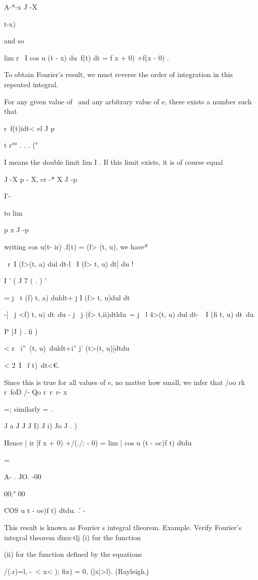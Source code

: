 A-*-x J -X

 t-x)

and so

lim r \ I cos u (t - x) du\ f(t) dt = \pi f x + 0) +f(x - 0) .

To obtain Fourier's result, we must reverse the order of integration
in this repeated integral.

For any given value of \ and any arbitrary value of e, there exists a
number such that

r\ f(t)idt< el J p

t r°° . . . ("

I means the double limit lim I . If this limit exists, it is of course
equal

J -X p -  X, cr -* X J -p

I'-

to lim

p x J -p

%
%

writing cos u(t- ir) .f(t) = (f> (t, u), we have*

\ r\ I (f>(t, a) dul dt-l \ I (f> t, u) dt] du !

I ' ( J 7 ( . ) '

= j \ t (f) t, a) duldt+ j I (f> t, u)dul dt

-[ \ j <f) t, u) dt\ du - j \ j (f> t,ii)dtldu\ = j \ l 4>(t, u) dul
dt-\ \ I (fi t, u) dt\ du

  P [J ) . fi )

< r \ i''\ < t>(t, u)\ duldt+i'' j' (t>(t, u)[dtdu

< 2\ I \ f t)\ dt<€.

Since this is true for all values of e, no matter how small, we infer
that /oo rk r\ foD /- Qo r\ r\ r- x

=; similarly = .

J a J J J I) J i) Jo J . )

Hence | ir [f x + 0) +/(./; - 0) = lim | cos u (t - oc)f t) dtdu

=

A- . JO. -00

00;" 00

COS u t - oe)f t) dtdu. .' -

This result is known as Fourier s integral tlieorem. Example. Verify
Fourier's integral theorem dinx-tlj (i) fur the function

(ii) for the function defined by the equations

/(.r)=l, -\ < x< ); fix) = 0, (|x|>l). (Rayleigh.j

